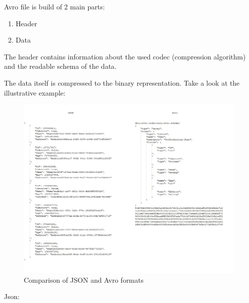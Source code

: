 \documentclass[]{article}
\begin{document}
Avro file is build of 2 main parts:
\begin{enumerate}
	\item Header
	\item Data
\end{enumerate}

The header contains information about the used codec (compression algorithm) and the readable schema of the data.

The data itself is compressed to the binary representation. Take a look at the illustrative example:


\begin{figure}[H]
	\centering
	\includegraphics[width=\textwidth]{json_avro_comparison}
	\caption{Comparison of JSON and Avro formats}
\end{figure}

Json:
\end{document}
